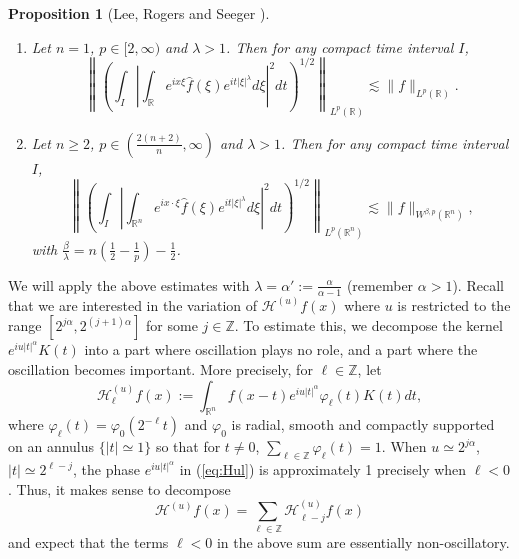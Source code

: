 \documentclass[12pt,leqno]{amsart}
\def\R{\mathbb{R}}
\def\Z{\mathbb{Z}}
\theoremstyle{plain}
\newtheorem{prop}[thm]{Proposition}
\numberwithin{equation}{section}
\begin{document}
\begin{prop}[Lee, Rogers and Seeger \cite{MR2946085}]\label{LRSsquare}
\begin{enumerate}
\item Let $n = 1$, $p \in [2,\infty)$ and $\lambda>1$. Then for any compact time interval $I$, 
\[
\left\|\left(\int_{I} \left| \int_{\R}e^{ix\xi}\hat{f}(\xi)e^{it|\xi|^{\lambda}} d\xi\right|^2 dt\right)^{1/2}\right\|_{L^p(\R)} \lesssim \|f\|_{L^{p}(\R)}.
\]
\item Let $n\ge 2$, $p \in (\frac{2(n+2)}{n},\infty)$ and $\lambda >1$. Then for any compact time interval $I$, 
\[
\left\|\left(\int_{I} \left| \int_{\R^n}e^{ix \cdot \xi}\hat{f}(\xi)e^{it|\xi|^{\lambda}} d\xi\right|^2 dt\right)^{1/2}\right\|_{L^p(\R^n)} \lesssim \|f\|_{W^{\beta,p}(\R^n)},
\]
with $\frac{ \beta }{ \lambda }=n(\frac{1}{2}-\frac{1}{p})-\frac{1}{2}$.
\end{enumerate}
\end{prop}
We will apply the above estimates with $\lambda = \alpha' := \frac{\alpha}{\alpha-1}$ (remember $\alpha > 1$).
Recall that we are interested in the variation of $\mathcal{H}^{(u)} f(x)$ where $u$ is restricted to the range $[2^{j \alpha}, 2^{(j+1) \alpha}]$ for some $j \in \Z$. To estimate this, we decompose the kernel $e^{i u |t|^{\alpha}} K(t)$ into a part where oscillation plays no role, and a part where the oscillation becomes important. More precisely, for $\ell \in \Z$, let
\begin{equation} \label{eq:Hul} 
\mathcal{H}^{(u)}_{\ell} f(x) := \int_{\R^n} f(x-t) e^{i u |t|^{\alpha}} \varphi_{\ell}(t) K(t) dt,
\end{equation}
where $\varphi_{\ell}(t) = \varphi_0(2^{-\ell} t)$ and $\varphi_0$ is radial, smooth and compactly supported on an annulus $\{|t| \simeq 1\}$ so that for $t \ne 0$, $\sum_{\ell \in \Z} \varphi_{\ell}(t) = 1$. When $u \simeq 2^{j \alpha}$, $|t| \simeq 2^{\ell-j}$, the phase $e^{i u |t|^{\alpha}}$ in (\ref{eq:Hul}) is approximately 1 precisely when $\ell < 0$. Thus, it makes sense to decompose
\begin{equation} \label{eq:decompl}
\mathcal{H}^{(u)} f(x) = \sum_{\ell \in \Z} \mathcal{H}^{(u)}_{\ell-j} f(x)
\end{equation}
and expect that the terms $\ell < 0$ in the above sum are essentially non-oscillatory. 
\end{document}
